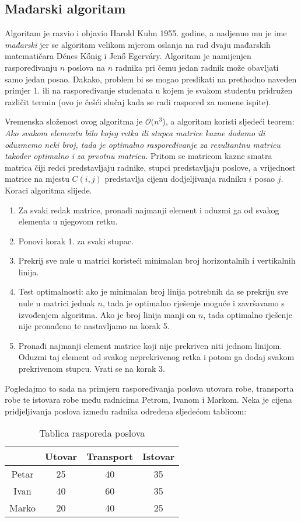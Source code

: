 \documentclass[times, utf8, zavrsni]{fer}
\begin{document}
\subsection{Mađarski algoritam}
Algoritam je razvio i objavio Harold Kuhn 1955. godine, a nadjenuo mu je ime \textit{mađarski} jer se algoritam velikom mjerom oslanja
na rad dvaju mađarskih matematičara Dénes Kőnig i Jenő Egerváry.
Algoritam je namijenjen raspoređivanju $n$ poslova na $n$ radnika pri čemu jedan radnik može obavljati samo jedan posao. Dakako,
problem bi se mogao preslikati na prethodno naveden primjer 1. ili na raspoređivanje studenata u kojem je svakom studentu pridružen
različit termin (ovo je češći slučaj kada se radi raspored za usmene ispite).

Vremenska složenost ovog algoritma je $\mathcal{O}(n^3$), a algoritam koristi sljedeći teorem:
\emph{Ako svakom elementu bilo kojeg retka ili stupca matrice kazne dodamo ili oduzmemo neki broj, tada je optimalno raspoređivanje za rezultantnu matricu također optimalno i za prvotnu matricu.} Pritom se matricom kazne smatra matrica čiji redci predstavljaju radnike, stupci predstavljaju poslove, a vrijednost matrice na mjestu $C(i, j)$ predstavlja cijenu dodjeljivanja radniku $i$ posao $j$.
Koraci algoritma slijede.
\begin{enumerate}
  \item Za svaki redak matrice, pronađi najmanji element i oduzmi ga od svakog elementa u njegovom retku.
  \item Ponovi korak 1. za svaki stupac.
  \item Prekrij sve nule u matrici koristeći minimalan broj horizontalnih i vertikalnih linija.
  \item Test optimalnosti: ako je minimalan broj linija potrebnih da se prekriju sve nule u matrici jednak $n$, tada je optimalno rješenje moguće
  i završavamo s izvođenjem algoritma. Ako je broj linija manji on $n$, tada optimalno rješenje nije pronađeno te nastavljamo na korak 5.
  \item Pronađi najmanji element matrice koji nije prekriven niti jednom linijom. Oduzmi taj element od svakog neprekrivenog
  retka i potom ga dodaj svakom prekrivenom stupcu. Vrati se na korak 3.
\end{enumerate}


Pogledajmo to sada na primjeru raspoređivanja poslova utovara robe, transporta robe te istovara robe među radnicima Petrom, Ivanom i Markom.
Neka je cijena pridjeljivanja poslova između radnika određena sljedećom tablicom:
\begin{table}[h!]
  \caption{Tablica rasporeda poslova}
  \label{tbl:poslovi}
  \centering
  \begin{tabular}{c | c | c | c}
          & Utovar & Transport & Istovar \\ \hline
    Petar & 25     & 40        & 35      \\ \hline
    Ivan  & 40     & 60        & 35      \\ \hline
    Marko & 20     & 40        & 25
  \end{tabular}
\end{table}
\end{document}

